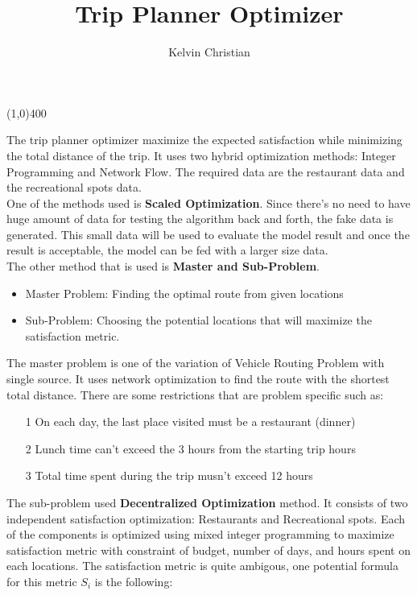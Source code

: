 \documentclass{article}
\title{Trip Planner Optimizer}
\author{Kelvin Christian}
\begin{document}
	\maketitle
	\begin{center}
		\line(1,0){400}
	\end{center}
	
	The trip planner optimizer maximize the expected satisfaction while minimizing the total distance of the trip. It uses two hybrid optimization methods: Integer Programming and Network Flow. The required data are the restaurant data and the recreational spots data. \\
	
	One of the methods used is \textbf{Scaled Optimization}. Since there's no need to have huge amount of data for testing the algorithm back and forth, the fake data is generated. This small data will be used to evaluate the model result and once the result is acceptable, the model can be fed with a larger size data. \\
	
	The other method that is used is \textbf{Master and Sub-Problem}.
	
	\begin{itemize}
		\item Master Problem: Finding the optimal route from given locations
		\item Sub-Problem: Choosing the potential locations that will maximize the satisfaction metric.
	\end{itemize}
	
	The master problem is one of the variation of Vehicle Routing Problem with single source. It uses network optimization to find the route with the shortest total distance. There are some restrictions that are problem specific such as:
	
	\begin{itemize}
		\item[1] On each day, the last place visited must be a restaurant (dinner)
		\item[2] Lunch time can't exceed the 3 hours from the starting trip hours
		\item[3] Total time spent during the trip musn't exceed 12 hours
	\end{itemize}
	
	The sub-problem used \textbf{Decentralized Optimization} method. It consists of two independent satisfaction optimization: Restaurants and Recreational spots. Each of the components is optimized using mixed integer programming to maximize satisfaction metric with constraint of budget, number of days, and hours spent on each locations. The satisfaction metric is quite ambigous, one potential formula for this metric $S_{i}$ is the following:
	
\end{document}
